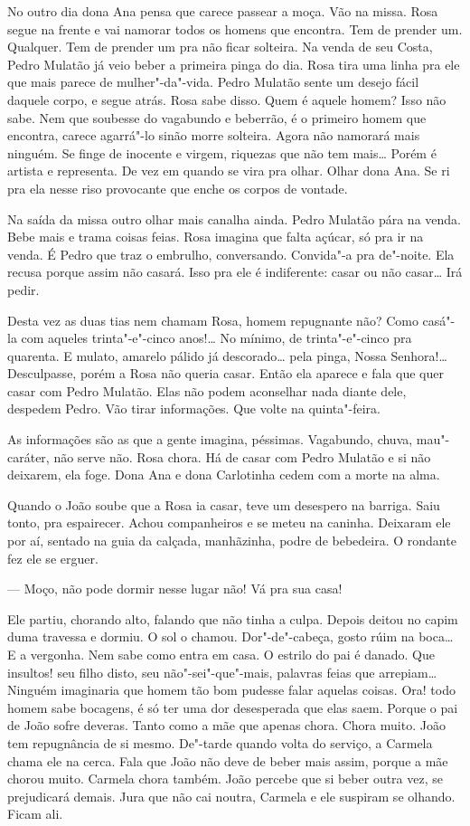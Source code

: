 \begin{linenumbers}
No outro dia dona Ana pensa que carece passear a moça. Vão na missa.
Rosa segue na frente e vai namorar todos os homens que encontra. Tem de
prender um. Qualquer. Tem de prender um pra não ficar solteira. Na venda
de seu Costa, Pedro Mulatão já veio beber a primeira pinga do dia. Rosa
tira uma linha pra ele que mais parece de mulher"-da"-vida. Pedro Mulatão
sente um desejo fácil daquele corpo, e segue atrás. Rosa sabe disso.
Quem é aquele homem? Isso não sabe. Nem que soubesse do vagabundo e
beberrão, é o primeiro homem que encontra, carece agarrá"-lo sinão morre
solteira. Agora não namorará mais ninguém. Se finge de inocente e
virgem, riquezas que não tem mais\ldots{} Porém é artista e representa. De
vez em quando se vira pra olhar. Olhar dona Ana. Se ri pra ela nesse
riso provocante que enche os corpos de vontade.

Na saída da missa outro olhar mais canalha ainda. Pedro Mulatão pára na
venda. Bebe mais e trama coisas feias. Rosa imagina que falta açúcar, só
pra ir na venda. É Pedro que traz o embrulho, conversando. Convida"-a pra
de"-noite. Ela recusa porque assim não casará. Isso pra ele é
indiferente: casar ou não casar\ldots{} Irá pedir.

Desta vez as duas tias nem chamam Rosa, homem repugnante não? Como
casá"-la com aqueles trinta"-e"-cinco anos!\ldots{} No mínimo, de trinta"-e"-cinco
pra quarenta. E mulato, amarelo pálido já descorado\ldots{} pela pinga, Nossa
Senhora!\ldots{} Desculpasse, porém a Rosa não queria casar. Então ela
aparece e fala que quer casar com Pedro Mulatão. Elas não podem
aconselhar nada diante dele, despedem Pedro. Vão tirar informações. Que
volte na quinta"-feira.

As informações são as que a gente imagina, péssimas. Vagabundo, chuva,
mau"-caráter, não serve não. Rosa chora. Há de casar com Pedro Mulatão e
si não deixarem, ela foge. Dona Ana e dona Carlotinha cedem com a morte
na alma.

Quando o João soube que a Rosa ia casar, teve um desespero na barriga.
Saiu tonto, pra espairecer. Achou companheiros e se meteu na caninha.
Deixaram ele por aí, sentado na guia da calçada, manhãzinha, podre de
bebedeira. O rondante fez ele se erguer.

--- Moço, não pode dormir nesse lugar não! Vá pra sua casa!

Ele partiu, chorando alto, falando que não tinha a culpa. Depois deitou
no capim duma travessa e dormiu. O sol o chamou. Dor"-de"-cabeça, gosto
rúim na boca\ldots{} E a vergonha. Nem sabe como entra em casa. O estrilo do
pai é danado. Que insultos! seu filho disto, seu não"-sei"-que"-mais,
palavras feias que arrepiam\ldots{} Ninguém imaginaria que homem tão bom
pudesse falar aquelas coisas. Ora! todo homem sabe bocagens, é só ter
uma dor desesperada que elas saem. Porque o pai de João sofre deveras.
Tanto como a mãe que apenas chora. Chora muito. João tem repugnância de
si mesmo. De"-tarde quando volta do serviço, a Carmela chama ele na
cerca. Fala que João não deve de beber mais assim, porque a mãe chorou
muito. Carmela chora também. João percebe que si beber outra vez, se
prejudicará demais. Jura que não cai noutra, Carmela e ele suspiram se
olhando. Ficam ali.


\end{linenumbers}
